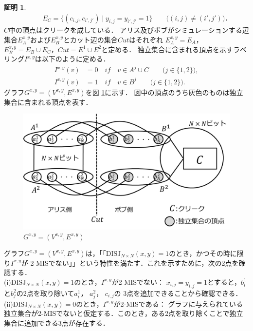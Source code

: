 \documentclass[12pt]{thesis}
\theoremstyle{definition}
\newtheorem*{prf*}{証明}
\begin{document}
\begin{prf*}
\begin{align*}
&\phantom{=} \quad E_{C} = \{(c_{i,j}, c_{i',j'}) \mid y_{i,j}=y_{i',j'}=1\} \quad \quad \text{($(i, j) \neq (i', j')$)}．
\end{align*}
$C$中の頂点はクリークを成している．
アリス及びボブがシミュレーションする辺集合$E^{x,y}_A$および$E^{x,y}_B$とカット辺の集合$\mathit{Cut}$はそれぞれ
$E^{x,y}_{A} = E_{A}$，$E^{x,y}_{B} = E_{B} \cup E_{C}$，$\mathit{Cut} = E^{1} \cup E^{2}$と定める．
独立集合に含まれる頂点を示すラベリング$I^{x,y}$は以下のように定める．
\begin{align*}
I^{x,y}(v) &= 0 \quad if \quad v \in A^{j} \cup C \quad \quad \text{($j \in \{1, 2\}$)}, \\
I^{x,y}(v) &= 1 \quad if \quad v \in B^{j} \quad \quad \text{($j \in \{1, 2\}$)}.
\end{align*}
グラフ$G^{x, y} = (V^{x,y}, E^{x,y})$を図 \ref{2_G(x,y)}に示す．
図中の頂点のうち灰色のものは独立集合に含まれる頂点を表す．
\begin{figure}[ht]
\begin{center}
\includegraphics[width=120mm]{2_Gxy.png}
\end{center}
\caption{$G^{x, y} = (V^{x,y}, E^{x,y})$}
\label{2_G(x,y)}
\end{figure}
グラフ$G^{x, y} = (V^{x,y}, E^{x,y})$は，「「$\mathrm{DISJ}_{N \times N} (x, y) = 1$のとき，かつその時に限り$I^{x,y}$が
2-MISでない」」という特性を満たす．これを示すために，次の2点を確認する． \\
(i)$\mathrm{DISJ}_{N \times N} (x, y) = 1$のとき，$I^{x,y}$が2-MISでない： 
$x_{i, j} = y_{i, j} =1$とすると，$b_{i}^{1}$と$b_{j}^{2}$の2点を取り除いて$a_{i}^{1}$， $a_{j}^{2}$， $c_{i, j}$の
3点を追加できることから確認できる． \\
(ii)$\mathrm{DISJ}_{N \times N} (x, y) = 0$のとき，$I^{x,y}$が2-MISである： 
グラフに与えられている独立集合が2-MISでないと仮定する．このとき，ある2点を取り除くことで独立集合に追加できる3点が存在する．

\end{prf*}
\end{document}

